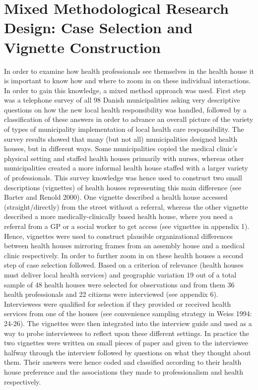 \chapter{Mixed Methodological Research Design: Case Selection and Vignette Construction}
In order to examine how health professionals see themselves in the health house it is important to know how and where to zoom in on these individual interactions. In order to gain this knowledge, a mixed method approach was used. First step was a telephone survey of all 98 Danish municipalities asking very descriptive questions on how the new local health responsibility was handled, followed by a classification of these answers in order to advance an overall picture of the variety of types of municipality implementation of local health care responsibility. The survey results showed that many (but not all) municipalities designed health houses, but in different ways. Some municipalities copied the medical clinic’s physical setting and staffed health houses primarily with nurses, whereas other municipalities created a more informal health house staffed with a larger variety of professionals. This survey knowledge was hence used to construct two small descriptions (vignettes) of health houses representing this main difference (see Barter and Renold 2000). One vignette described a health house accessed (straight/directly) from the street without a referral, whereas the other vignette described a more medically-clinically based health house, where you need a referral from a GP or a social worker to get access (see vignettes in appendix 1). Hence, vignettes were used to construct plausible organizational differences between health houses mirroring frames from an assembly house and a medical clinic respectively. In order to further zoom in on these health houses a second step of case selection followed. Based on a criterion of relevance (health houses must deliver local health services) and geographic variation 19 out of a total sample of 48 health houses were selected for observations and from them 36 health professionals and 22 citizens were interviewed (see appendix 6). Interviewees were qualified for selection if they provided or received health services from one of the houses (see convenience sampling strategy in Weiss 1994: 24-26). The vignettes were then integrated into the interview guide and used as a way to probe interviewees to reflect upon these different settings. In practice the two vignettes were written on small pieces of paper and given to the interviewee halfway through the interview followed by questions on what they thought about them. Their answers were hence coded and classified according to their health house preference and the associations they made to professionalism and health respectively. 
